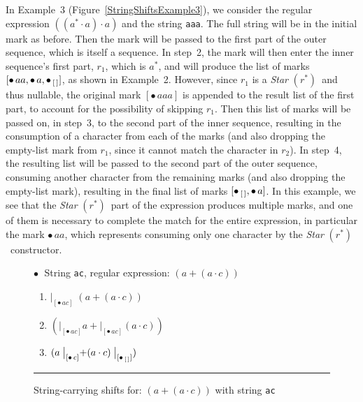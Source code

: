 \documentclass[12pt]{article}
\newcommand{\Marked}[1]{\bullet\,#1}
\newcommand{\STARText}{\textit{Star} $(r^*)$}
\newcommand{\emptylist}{[\,]}
\begin{document}
In Example~3 (Figure~\ref{StringShiftsExample3}), we consider the regular expression 
$((a^* \cdot a) \cdot a)$ and the string \texttt{aaa}. The full string will be in the 
initial mark as before. Then the mark will be passed to the first part of the outer 
sequence, which is itself a sequence. In step~2, the mark will then enter the inner 
sequence's first part, $r_1$, which is $a^*$, and will produce the list of marks 
$[\Marked{aa}, \Marked{a}, \Marked_{\emptylist}]$, as shown in Example~2. However, 
since $r_1$ is a \STARText\ and thus nullable, the original mark $[\Marked{aaa}]$ 
is appended to the result list of the first part, to account for the possibility 
of skipping $r_1$. Then this list of marks will be passed on, in step~3, to the 
second part of the inner sequence, resulting in the consumption of a character 
from each of the marks (and also dropping the empty-list mark from $r_1$, since 
it cannot match the character in $r_2$). In step~4, the resulting list will be passed to the second part of the outer sequence, 
consuming another character from the remaining marks (and also dropping the empty-list 
mark), resulting in the final list of marks $[\Marked_{\emptylist}, \Marked{a}]$. 
In this example, we see that the \STARText\ part of the expression produces multiple 
marks, and one of them is necessary to complete the match for the entire expression, in 
particular the mark $\Marked{aa}$, which represents consuming only one character by the 
\STARText\ constructor.


\begin{figure}[ht]
  $\bullet\;$ String \texttt{ac}, regular expression: $(a + (a \cdot c))$
  \begin{center}
    \begin{enumerate}
      \item $\bigl|_{[\Marked{ac}]} \;( a + (a \cdot c) )$
      \item $(\bigl|_{[\Marked{ac}]} a + \bigl|_{[\Marked{ac}]} (a \cdot c))$
      \item $(a \;\bigl|_{[\Marked{c}]} + (a \cdot c)\;\bigl|_{[\Marked_{\emptylist}]})$
    \end{enumerate}
  \end{center}
  \mbox{}
  \hrule
  \caption{String-carrying shifts for: $(a + (a \cdot c))$ with string \texttt{ac}}
  \label{StringShiftsExample1}
\end{figure}
\end{document}
